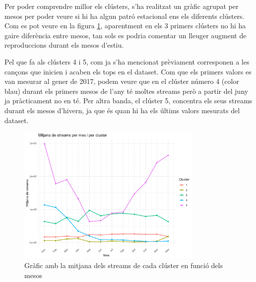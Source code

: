 Per poder comprendre millor els clústers, s'ha realitzat un gràfic agrupat per mesos per poder veure si hi ha algun patró estacional ens els diferents clústers. Com es pot veure en la figura \ref{fig:TS_evol_streams_per_mes_i_cluster}, aparentment en els 3 primers clústers no hi ha gaire diferència entre mesos, tan sols es podria comentar un lleuger augment de reproduccions durant els mesos d'estiu.

Pel que fa als clústers 4 i 5, com ja s'ha mencionat prèviament corresponen a les cançons que inicien i acaben els tops en el dataset. Com que els primers valors es van mesurar al gener de 2017, podem veure que en el clúster número 4 (color blau) durant els primers mesos de l'any té moltes streams però a partir del juny ja pràcticament no en té. Per altra banda, el clúster 5, concentra els seus streams durant els mesos d'hivern, ja que és quan hi ha els últims valors mesurats del dataset.

\begin{figure}[H]
    \centering
    \includegraphics[width=0.8\textwidth]{Images/4_clustering/time_series/evol_streams_per_mes_i_cluster.png}
    \caption{Gràfic amb la mitjana dels streams de cada clúster en funció dels mesos}
    \label{fig:TS_evol_streams_per_mes_i_cluster}
\end{figure}

